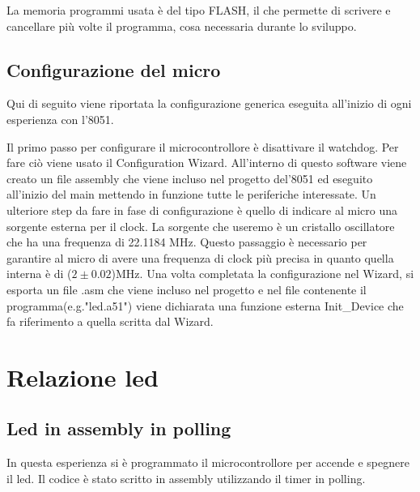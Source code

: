 \documentclass[main.tex]{subfiles}
\begin{document}
La memoria programmi usata è del tipo FLASH, il che permette di scrivere e cancellare più volte il programma, cosa necessaria durante lo sviluppo. 


\subsection{Configurazione del micro}

Qui di seguito viene riportata la configurazione generica eseguita all'inizio di ogni esperienza con l'8051.

Il primo passo per configurare il microcontrollore è disattivare il watchdog. Per fare ciò viene usato il Configuration Wizard. All'interno di questo software viene creato un file assembly che viene incluso nel progetto del'8051 ed eseguito all'inizio del main mettendo in funzione tutte le periferiche interessate. Un ulteriore step da fare in fase di configurazione è quello di indicare al micro una sorgente esterna per il clock. La sorgente che useremo è un cristallo oscillatore che ha una frequenza di 22.1184 MHz. Questo passaggio è necessario per garantire al micro di avere una frequenza di clock più precisa in quanto quella interna è di ($2\pm0.02$)MHz.
Una volta completata la configurazione nel Wizard, si esporta un file .asm che viene incluso nel progetto e nel file contenente il programma(e.g."led.a51") viene dichiarata una funzione esterna Init\_Device che fa riferimento a quella scritta dal Wizard.

\section{Relazione led}
\subsection{Led in assembly in polling}

In questa esperienza si è programmato il microcontrollore per accende e spegnere il led. Il codice è stato scritto in assembly utilizzando il timer in polling.
\end{document}
